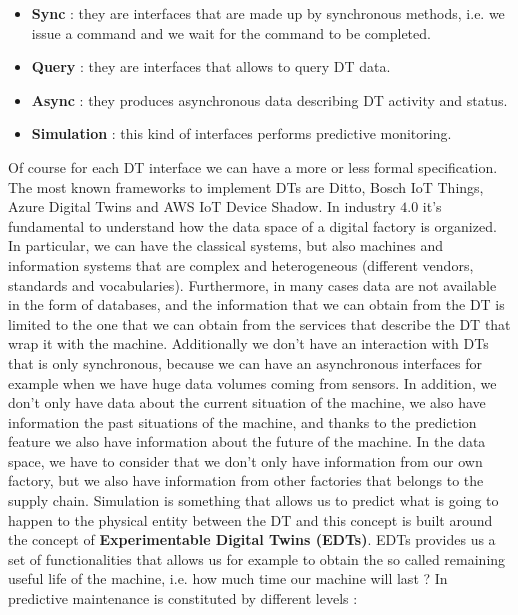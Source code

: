 \documentclass[11pt]{article}
\begin{document}
\begin{itemize}
\item \textbf{Sync} : they are interfaces that are made up by synchronous methods, i.e. we issue a command and we wait for the command to be completed.

\item \textbf{Query} : they are interfaces that allows to query DT data.

\item \textbf{Async} : they produces asynchronous data describing DT activity and status.

\item \textbf{Simulation} : this kind of interfaces performs predictive monitoring.
\end{itemize}

Of course for each DT interface we can have a more or less formal specification. The most known frameworks to implement DTs are Ditto, Bosch IoT Things, Azure Digital Twins and AWS IoT Device Shadow. In industry $4.0$ it's fundamental to understand how the data space of a digital factory is organized. In particular, we can have the classical systems, but also machines and information systems that are complex and heterogeneous (different vendors, standards and vocabularies). Furthermore, in many cases data are not available in the form of databases, and the information that we can obtain from the DT is limited to the one that we can obtain from the services that describe the DT that wrap it with the machine. Additionally we don't have an interaction with DTs that is only synchronous, because we can have an asynchronous interfaces for example when we have huge data volumes coming from sensors. In addition, we don't only have data about the current situation of the machine, we also have information the past situations of the machine, and thanks to the prediction feature we also have information about the future of the machine. In the data space, we have to consider that we don't only have information from our own factory, but we also have information from other factories that belongs to the supply chain. Simulation is something that allows us to predict what is going to happen to the physical entity between the DT and this concept is built around the concept of \textbf{Experimentable Digital Twins (EDTs)}. EDTs provides us a set of functionalities that allows us for example to obtain the so called remaining useful life of the machine, i.e. how much time our machine will last ? In predictive maintenance is constituted by different levels :
\end{document}
